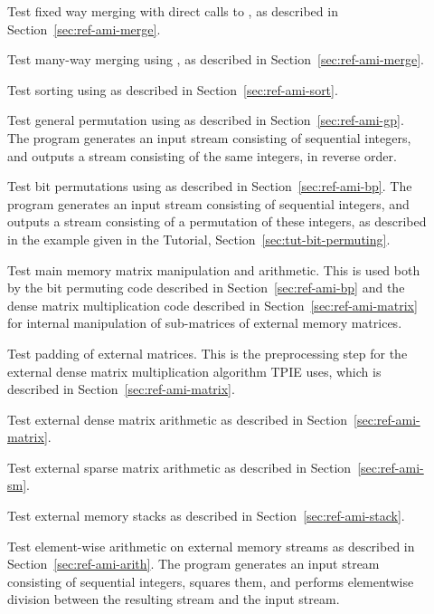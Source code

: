 \begin{description}
\item[] Test fixed way merging with direct
  calls to , as described in 
  Section~\ref{sec:ref-ami-merge}.
\item[] Test many-way merging using 
  , as described in 
  Section~\ref{sec:ref-ami-merge}.
\item[] Test sorting using  as
  described in Section~\ref{sec:ref-ami-sort}.
\item[] Test general permutation using
   as described in Section~\ref{sec:ref-ami-gp}.
The program generates an input stream
consisting of sequential integers, and outputs a stream consisting of 
the same integers, in reverse order.
\item[] Test bit permutations using
   as described in
  Section~\ref{sec:ref-ami-bp}. The program generates an input stream
consisting of sequential integers, and outputs a stream consisting of 
a permutation of these integers, as described in the example given in the Tutorial, Section~\ref{sec:tut-bit-permuting}.
\item[]
\item[] Test main memory matrix manipulation
  and arithmetic.  This is used both by the bit permuting code
  described in Section~\ref{sec:ref-ami-bp} and the dense matrix
  multiplication code described in Section~\ref{sec:ref-ami-matrix}
  for internal manipulation of sub-matrices of external memory
  matrices.
\item[] Test padding of external
  matrices.  This is the preprocessing step for the external dense
  matrix multiplication algorithm TPIE uses, which is described in 
  Section~\ref{sec:ref-ami-matrix}. 
\item[] Test external dense matrix arithmetic
  as described in Section~\ref{sec:ref-ami-matrix}.
\item[] Test external sparse matrix arithmetic
  as described in Section~\ref{sec:ref-ami-sm}.
\item[] Test external memory stacks as
  described in Section~\ref{sec:ref-ami-stack}.
\item[] Test element-wise arithmetic on
  external memory streams as described in Section~\ref{sec:ref-ami-arith}.
The program generates an input stream
consisting of sequential integers, squares them, and performs 
elementwise division between the resulting stream and the input stream.
\end{description}


